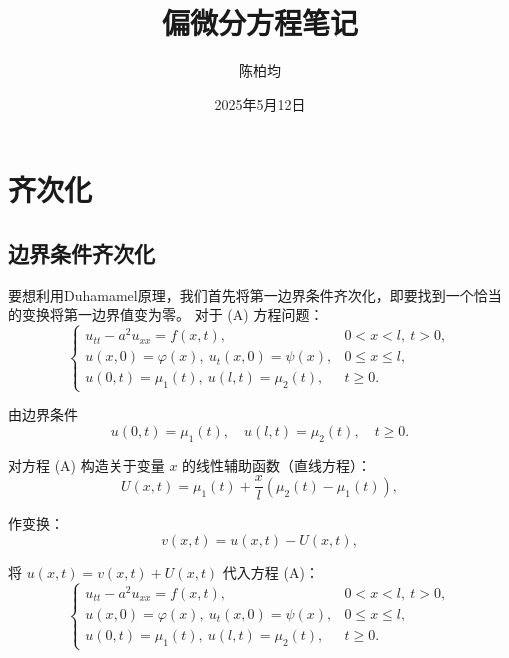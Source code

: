 \documentclass[12pt,a4paper]{article}
\title{偏微分方程笔记}
\author{陈柏均}
\date{2025年5月12日}
\numberwithin{subsection}{section}   %
\numberwithin{subsubsection}{subsection}
\theoremstyle{plain}
\theoremstyle{definition}
\theoremstyle{remark}
\theoremstyle{remark}
\begin{document}
	
	\maketitle


\newpage
	
	\tableofcontents  %
	
	
	\newpage
	
		\section{齐次化}
	\subsection{边界条件齐次化}
	要想利用Duhamamel原理，我们首先将第一边界条件齐次化，即要找到一个恰当的变换将第一边界值变为零。
	对于	(A) 方程问题：
	\begin{equation}
		\begin{cases}
			u_{tt} - a^2 u_{xx} = f(x, t), & 0 < x < l, \ t > 0, \\
			u(x, 0) = \varphi(x), \ u_t(x, 0) = \psi(x), & 0 \leq x \leq l, \\
			u(0, t) = \mu_1(t), \ u(l, t) = \mu_2(t), & t \geq 0.
		\end{cases}
	\end{equation}
	
	由边界条件
	\begin{equation}
		u(0,t) = \mu_1(t), \quad u(l,t) = \mu_2(t), \quad t \geq 0.
	\end{equation}
	
	对方程 (A) 构造关于变量 \(x\) 的线性辅助函数（直线方程）：
	\begin{equation}
		U(x, t) = \mu_1(t) + \frac{x}{l}(\mu_2(t) - \mu_1(t)),
	\end{equation}
	
	作变换：
	\begin{equation}
		v(x, t) = u(x, t) - U(x, t),
	\end{equation}
	
	将 \(u(x, t) = v(x, t) + U(x, t)\) 代入方程 (A)：
	\begin{equation}
		\begin{cases}
			u_{tt} - a^2 u_{xx} = f(x, t), & 0 < x < l, \ t > 0, \\
			u(x, 0) = \varphi(x), \ u_t(x, 0) = \psi(x), & 0 \leq x \leq l, \\
			u(0, t) = \mu_1(t), \ u(l, t) = \mu_2(t), & t \geq 0.
		\end{cases}
	\end{equation}
	
\end{document}
